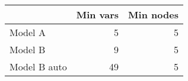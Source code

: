 
\begin{tabular}{l|r|r}
\hline
  & Min vars & Min nodes\\
\hline
Model A & 5 & 5\\
\hline
Model B & 9 & 5\\
\hline
Model B auto & 49 & 5\\
\hline
\end{tabular}